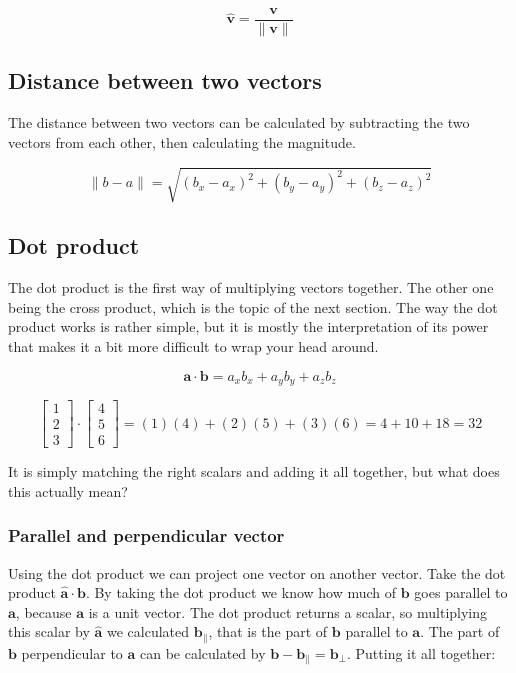 \documentclass[a4paper,11pt]{article}
\begin{document}
$$\hat{\textbf{v}}=\frac{\textbf{v}}{\|\textbf{v}\|}$$

\subsection{Distance between two vectors}

The distance between two vectors can be calculated by subtracting the two vectors from each other, then calculating the magnitude.

$$\|b-a\|=\sqrt{(b_x-a_x)^2+(b_y-a_y)^2+(b_z-a_z)^2}$$

\subsection{Dot product}

The dot product is the first way of multiplying vectors together. The other one being the cross product, which is the topic of the next section. The way the dot product works is rather simple, but it is mostly the interpretation of its power that makes it a bit more difficult to wrap your head around.

$$\textbf{a}\cdot\textbf{b}=a_xb_x+a_yb_y+a_zb_z$$

$$
\begin{bmatrix}
1 \\ 2 \\ 3
\end{bmatrix} \cdot
\begin{bmatrix}
4 \\ 5 \\ 6
\end{bmatrix}=(1)(4)+(2)(5)+(3)(6)=4+10+18=32
$$

It is simply matching the right scalars and adding it all together, but what does this actually mean?

\subsubsection{Parallel and perpendicular vector}

Using the dot product we can project one vector on another vector. Take the dot product $\hat{\textbf{a}}\cdot\textbf{b}$. By taking the dot product we know how much of $\textbf{b}$ goes parallel to $\textbf{a}$, because $\textbf{a}$ is a unit vector. The dot product returns a scalar, so multiplying this scalar by $\hat{\textbf{a}}$ we calculated $\textbf{b}_\|$, that is the part of $\textbf{b}$ parallel to $\textbf{a}$. The part of $\textbf{b}$ perpendicular to $\textbf{a}$ can be calculated by $\textbf{b}-\textbf{b}_\|=\textbf{b}_\perp$. Putting it all together:
\end{document}
